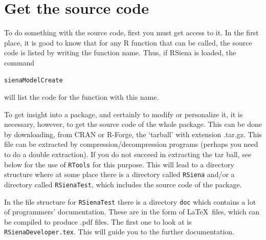 \documentclass[a4paper,fleqn,11pt]{article}
\newcommand{\+}{\, + \,}
\newcommand{\sfn}[1]{\textsf{#1}}
\newcommand{\R}{{\sf R }}
\newcommand{\RS}{{\sf RSiena }}
\begin{document}
{\section{Get the source code}

To do something with the source code,
first you must get access to it.
In the first place, it is good to know that for any \R function
that can be called,
the source code is listed by writing the function name.
Thus, if \RS is loaded, the command
\begin{verbatim}
sienaModelCreate
\end{verbatim}
will list the code for the function with this name.

To get insight into a package, and certainly to modify
or personalize it, it is necessary, however,
to get the source code of the whole package.
This can be done by downloading, from CRAN or R-Forge,
the `tarball' with extension \sfn{.tar.gz}.
This file can be extracted by compression/decompression
programs (perhaps you need to do a double extraction).
If you do not succeed in extracting the tar ball, see below
for the use of \texttt{RTools} for this purpose.
This will lead to a directory structure where at some place
there is a directory called \texttt{RSiena} and/or a directory
called \texttt{RSienaTest}, which includes the source code
of the package.

In the file structure for \texttt{RSienaTest} there is a directory
\texttt{doc} which contains a lot of programmers' documentation.
These are in the form of \LaTeX \ files, which can be compiled
to produce .pdf files.
The first one to look at is \texttt{RSienaDeveloper.tex}.
This will guide you to the further documentation.

}
\end{document}
